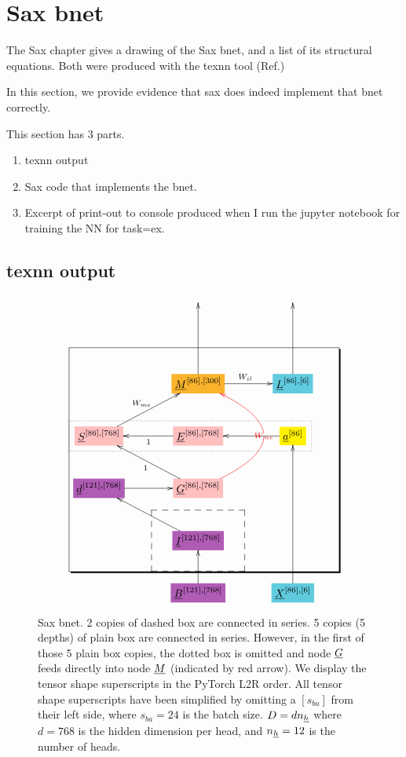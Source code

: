 \documentclass[12pt]{article}
\begin{document}
\section{Sax bnet}

The Sax chapter gives 
a drawing
of the Sax bnet,
and a list
of its structural
equations.
Both were produced with the texnn tool (Ref.\cite{texnn})

In this section,
we provide 
evidence that
 sax
 does indeed implement
 that bnet correctly.

This section has 3 parts.

\begin{enumerate}

\item texnn output

\item Sax code
that implements the bnet.
\item Excerpt of print-out to console produced when I run
the jupyter notebook for training 
the NN for task=ex. 


\end{enumerate}

\subsection{texnn output}

\begin{figure}[h!]\centering
$$\xymatrix@R=2.5pc@C=3.5pc{
&&
\\
&&
\\
&*+[F*:Dandelion]{\underline{M}^{[86], [300]}}\ar[uu]\ar[r]^{W_{il}}&*+[F*:SkyBlue]{\underline{L}^{[86], [6]}}\ar[uu]
\\
*+[F*:pink]{\underline{S}^{[86], [768]}}\ar[ur]^{W_{me}}&*+[F*:pink]{\underline{E}^{[86], [768]}}\ar[l]^{1}&*+[F*:yellow]{\underline{a}^{[86]}}\ar[l]
\\
*+[F*:Orchid]{\underline{d}^{[121], [768]}}\ar[r]&*+[F*:pink]{\underline{G}^{[86], [768]}}\ar@[red]@/_5pc/[uu]|-{\color{red} W_{me}}\ar[ul]^{1}&
\\
&*+[F*:Orchid]{\underline{I}^{[121], [768]}}\ar[ul]&
\\
&*+[F*:Orchid]{\underline{B}^{[121], [768]}}\ar[u]&*+[F*:SkyBlue]{\underline{X}^{[86], [6]}}\ar[uuu]
\save
\POS"3,1"."6,1"."3,3"."6,3"!C*+<4.8em>\frm{-,}
\POS"6,2"."6,2"."6,2"."6,2"!C*+<3.8em>\frm{--}
\POS"4,1"."4,1"."4,3"."4,3"!C*+<1.0em>\frm{.}
\restore
}$$
\caption{Sax bnet. 2 copies of dashed box are connected in series. 5 copies (5 depths) of plain box are connected in series.  However, in the first of those 5 plain box copies, the dotted box  is omitted and node $\underline{G}$ feeds directly into node  $\underline{M}$ (indicated by red arrow). We display the tensor shape superscripts in the PyTorch L2R order. All tensor shape superscripts have been simplified by omitting a $[s_{ba}]$ from their left side, where $s_{ba}=24$ is the batch size. $D= d n_{\underline{h}}$ where $d=768$ is the hidden dimension per head, and $n_{\underline{h}}=12$ is the number of heads. }
\label{fig-texnn-for-sentence-ax-bnet}
\end{figure}
\end{document}
